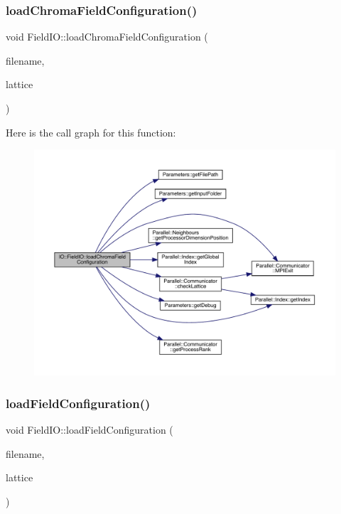 \subsubsection{\texorpdfstring{loadChromaFieldConfiguration()}{loadChromaFieldConfiguration()}}
{\footnotesize\ttfamily void Field\+I\+O\+::load\+Chroma\+Field\+Configuration (\begin{DoxyParamCaption}\item[{std\+::string}]{filename,  }\item[{\mbox{\hyperlink{class_lattice}{Lattice}}$<$ \mbox{\hyperlink{class_s_u3}{S\+U3}} $>$ $\ast$}]{lattice }\end{DoxyParamCaption})\hspace{0.3cm}{\ttfamily [static]}}

Here is the call graph for this function\+:\nopagebreak
\begin{figure}[H]
\begin{center}
\leavevmode
\includegraphics[width=350pt]{class_i_o_1_1_field_i_o_af23fb6e02a6bd1cafd5be4acacbf848e_cgraph}
\end{center}
\end{figure}
\mbox{\label{class_i_o_1_1_field_i_o_a02db864a48601edd7febaab5d655e495}} 
\subsubsection{\texorpdfstring{loadFieldConfiguration()}{loadFieldConfiguration()}}
{\footnotesize\ttfamily void Field\+I\+O\+::load\+Field\+Configuration (\begin{DoxyParamCaption}\item[{std\+::string}]{filename,  }\item[{\mbox{\hyperlink{class_lattice}{Lattice}}$<$ \mbox{\hyperlink{class_s_u3}{S\+U3}} $>$ $\ast$}]{lattice }\end{DoxyParamCaption})\hspace{0.3cm}{\ttfamily [static]}}

